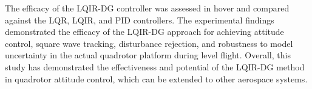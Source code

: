\documentclass[3p,times]{elsarticle}
\begin{document}
The efficacy of the LQIR-DG controller was assessed in hover and compared against the LQR, LQIR, and PID controllers. The experimental findings demonstrated the efficacy of the LQIR-DG approach for achieving attitude control, square wave tracking, disturbance rejection, and robustness to model uncertainty in the actual quadrotor platform during level flight. Overall, this study has demonstrated the effectiveness and potential of the LQIR-DG method in quadrotor attitude control, which can be extended to other aerospace systems.

















\end{document}
